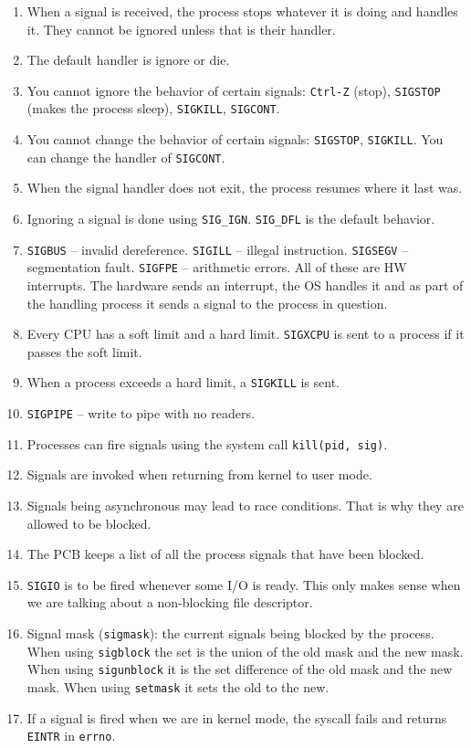 \documentclass[12pt,a4paper]{article}
\begin{document}
\begin{enumerate}
  \item When a signal is received, the process stops whatever it is doing and handles it. They cannot be ignored unless that is their handler.
  \item The default handler is ignore or die.
  \item You cannot ignore the behavior of certain signals: \texttt{Ctrl-Z} (stop), \texttt{SIGSTOP} (makes the process sleep), \texttt{SIGKILL}, \texttt{SIGCONT}.
  \item You cannot change the behavior of certain signals: \texttt{SIGSTOP}, \texttt{SIGKILL}. You can change the handler of \texttt{SIGCONT}.
  \item When the signal handler does not exit, the process resumes where it last was.
  \item Ignoring a signal is done using \texttt{SIG\_IGN}. \texttt{SIG\_DFL} is the default behavior.
  \item \texttt{SIGBUS} -- invalid dereference. \texttt{SIGILL} -- illegal instruction. \texttt{SIGSEGV} -- segmentation fault. \texttt{SIGFPE} -- arithmetic errors. All of these are HW interrupts. The hardware sends an interrupt, the OS handles it and as part of the handling process it sends a signal to the process in question.
  \item Every CPU has a soft limit and a hard limit. \texttt{SIGXCPU} is sent to a process if it passes the soft limit.
  \item When a process exceeds a hard limit, a \texttt{SIGKILL} is sent.
  \item \texttt{SIGPIPE} -- write to pipe with no readers.
  \item Processes can fire signals using the system call \texttt{kill(pid, sig)}.
  \item Signals are invoked when returning from kernel to user mode.
  \item Signals being asynchronous may lead to race conditions. That is why they are allowed to be blocked.
  \item The PCB keeps a list of all the process signals that have been blocked.
  \item \texttt{SIGIO} is to be fired whenever some I/O is ready. This only makes sense when we are talking about a non-blocking file descriptor.
  \item Signal mask (\texttt{sigmask}): the current signals being blocked by the process. When using \texttt{sigblock} the set is the union of the old mask and the new mask. When using \texttt{sigunblock} it is the set difference of the old mask and the new mask. When using \texttt{setmask} it sets the old to the new.
  \item If a signal is fired when we are in kernel mode, the syscall fails and returns \texttt{EINTR} in \texttt{errno}.
\end{enumerate}
\end{document}

